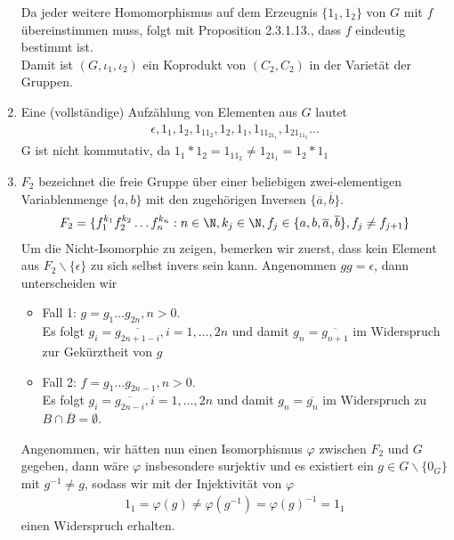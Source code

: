 \begin{solution}
\begin{enumerate}
  Da jeder weitere Homomorphismus auf dem Erzeugnis $\{1_1,1_2\}$ von $G$
  mit $f$ übereinstimmen muss, folgt mit Proposition 2.3.1.13., dass
  $f$ eindeutig bestimmt ist. \\
  Damit ist $(G,\iota_1,\iota_2)$ ein Koprodukt von $(C_2,C_2)$ in der Varietät
  der Gruppen.
  \item Eine (vollständige) Aufzählung von Elementen aus $G$ lautet
  \begin{align*}
    \epsilon,1_1,1_2,1_11_2,1_2,1_1,1_11_21_1,1_21_11_2\dots
  \end{align*}
  G ist nicht kommutativ, da $1_1*1_2 = 1_11_2 \neq 1_21_1 = 1_2*1_1$
  \item $F_2$ bezeichnet die freie Gruppe über einer beliebigen zwei-elementigen
  Variablenmenge $\{a,b\}$ mit den zugehörigen Inversen $\{\overline{a},\overline{b}\}$.
  \begin{align*}
    F_2 = \{f_1^{k_1}f_2^{k_2}\dots f_n^{k_n}: n \in \N,k_j \in \N, f_j \in
    \{a,b,\overline{a},\overline{b}\}, f_j \neq f_{j+1}\}
  \end{align*}
  Um die Nicht-Isomorphie zu zeigen, bemerken wir zuerst, dass kein Element aus $F_2\backslash\{\epsilon\}$
  zu sich selbst invers sein kann. Angenommen $gg = \epsilon$, dann unterscheiden wir
  \begin{itemize}
    \item Fall 1: $g = g_1\dots g_{2n}, n > 0$.\\
    Es folgt $g_i = \overline{g_{2n+1-i}}, i = 1,\dots,2n$ und damit $g_{n} = \overline{g_{n+1}}$
    im Widerspruch zur Gekürztheit von $g$
    \item Fall 2: $f = g_1\dots g_{2n-1}, n > 0$. \\
    Es folgt $g_i = \overline{g_{2n-i}}, i = 1,\dots,2n$ und damit $g_{n} = \overline{g_n}$
    im Widerspruch zu $B \cap \overline{B} = \emptyset$.
  \end{itemize}
  Angenommen, wir hätten nun einen Isomorphismus $\varphi$ zwischen $F_2$ und $G$
  gegeben, dann wäre $\varphi$ insbesondere surjektiv und es existiert ein $g \in G\backslash\{0_G\}$
  mit $g^{-1} \neq g$,
  sodass wir mit der Injektivität von $\varphi$
  \begin{align*}
    1_1 = \varphi(g) \neq \varphi(g^{-1}) = \varphi(g)^{-1} = 1_1
  \end{align*}
  einen Widerspruch erhalten.
\end{enumerate}
\end{solution}
